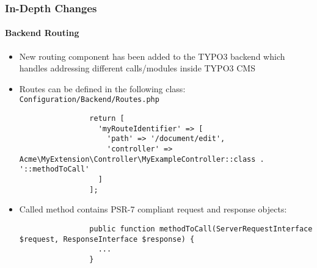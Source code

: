 \begin{frame}[fragile]
	\frametitle{In-Depth Changes}
	\framesubtitle{Backend Routing}

	\lstset{basicstyle=\tiny\ttfamily}

	\begin{itemize}

		\item New routing component has been added to the TYPO3 backend which handles
			addressing different calls/modules inside TYPO3 CMS

		\item Routes can be defined in the following class:\newline
			\small
				\texttt{Configuration/Backend/Routes.php}
			\normalsize

			\begin{lstlisting}
				return [
				  'myRouteIdentifier' => [
				    'path' => '/document/edit',
				    'controller' => Acme\MyExtension\Controller\MyExampleController::class . '::methodToCall'
				  ]
				];
			\end{lstlisting}

		\item Called method contains PSR-7 compliant request and response objects:

			\begin{lstlisting}
				public function methodToCall(ServerRequestInterface $request, ResponseInterface $response) {
				  ...
				}
			\end{lstlisting}

	\end{itemize}

\end{frame}


